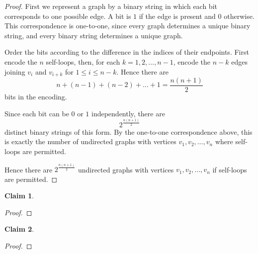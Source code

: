 \documentclass{article}
\newtheorem{claim}{Claim}
\begin{document}
\begin{proof}
    First we represent a graph by a binary string in which each bit corresponds to one possible edge. A bit 
    is $1$ if the edge is present and $0$ otherwise. This correspondence is one-to-one, since every graph 
    determines a unique binary string, and every binary string determines a unique graph.

    \medskip

    Order the bits according to the difference in the indices of their endpoints. First encode the $n$ 
    self-loops, then, for each $k = 1, 2, \dots, n - 1$, encode the $n - k$ edges joining $v_i$ and 
    $v_{i+k}$ for $1 \le i \le n - k$. Hence there are
    \[
    n + (n - 1) + (n - 2) + \dots + 1 = \frac{n(n+1)}{2}
    \]
    bits in the encoding.

    \medskip

    Since each bit can be $0$ or $1$ independently, there are
    \[
    2^{\frac{n(n+1)}{2}}
    \]
    distinct binary strings of this form. By the one-to-one correspondence above, this is exactly the number 
    of undirected graphs with vertices $v_1, v_2, \dots, v_n$ where self-loops are permitted.

    \medskip

    Hence there are $2^{\frac{n(n+1)}{2}}$ undirected graphs with vertices $v_1, v_2, \dots, v_n$ if 
    self-loops are permitted.
\end{proof}

\begin{claim}
    
\end{claim}

\begin{proof}
    
\end{proof}

\begin{claim}
    
\end{claim}

\begin{proof}
    
\end{proof}
\end{document}
